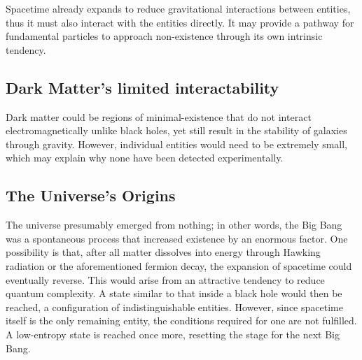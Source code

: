 \documentclass{article}
\begin{document}
Spacetime already expands to reduce gravitational interactions between entities, thus it must also interact with the entities directly.
It may provide a pathway for fundamental particles to approach non-existence through its own intrinsic tendency.


\subsection{Dark Matter's limited interactability}

Dark matter could be regions of minimal-existence that do not interact electromagnetically unlike black holes, yet still result in the stability of galaxies through gravity.
However, individual entities would need to be extremely small, which may explain why none have been detected experimentally.


\subsection{The Universe's Origins}

The universe presumably emerged from nothing; in other words, the Big Bang was a spontaneous process that increased existence by an enormous factor. 
One possibility is that, after all matter dissolves into energy through Hawking radiation or the aforementioned fermion decay, the expansion of spacetime could eventually reverse. 
This would arise from an attractive tendency to reduce quantum complexity. 
A state similar to that inside a black hole would then be reached, a configuration of indistinguishable entities. 
However, since spacetime itself is the only remaining entity, the conditions required for one are not fulfilled. 
A low-entropy state is reached once more, resetting the stage for the next Big Bang.



\newpage
\printbibliography
\end{document}
